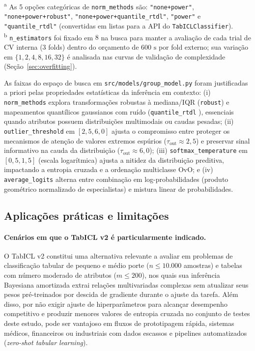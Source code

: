 \documentclass[11pt,a4paper]{article}
\begin{document}
\begin{table}[htbp]
    \begin{flushleft}
    \footnotesize
    \textsuperscript{a} As 5 opções categóricas de \texttt{norm\_methods} são: \texttt{"none+power"}, \texttt{"none+power+robust"}, \texttt{"none+power+quantile\_rtdl"}, \texttt{"power"} e \texttt{"quantile\_rtdl"} (convertidas em listas para a API do \texttt{TabICLClassifier}).\\
    \textsuperscript{b} \texttt{n\_estimators} foi fixado em $8$ na busca para manter a avaliação de cada trial de CV interna (3 folds) dentro do orçamento de $600\text{ s}$ por fold externo; sua variação em $\{1, 2, 4, 8, 16, 32\}$ é analisada nas curvas de validação de complexidade (Seção~\ref{sec:overfitting}).
    \end{flushleft}
\end{table}

As faixas do espaço de busca em \texttt{src/models/group\_model.py} foram justificadas a priori pelas propriedades estatísticas da inferência em contexto: (i) \texttt{norm\_methods} explora transformações robustas à mediana/IQR (\texttt{robust}) e mapeamentos quantílicos gaussianos com ruído (\texttt{quantile\_rtdl} \cite{gorishniy2021revisiting}), essenciais quando atributos possuem distribuições multimodais ou caudas pesadas; (ii) \texttt{outlier\_threshold} em $[2{,}5, 6{,}0]$ ajusta o compromisso entre proteger os mecanismos de atenção de valores extremos espúrios ($\tau_{\mathrm{out}} \approx 2{,}5$) e preservar sinal informativo na cauda da distribuição ($\tau_{\mathrm{out}} \approx 6{,}0$); (iii) \texttt{softmax\_temperature} em $[0{,}5, 1{,}5]$ (escala logarítmica) ajusta a nitidez da distribuição preditiva, impactando a entropia cruzada e a ordenação multiclasse OvO; e (iv) \texttt{average\_logits} alterna entre combinação em log-probabilidades (produto geométrico normalizado de especialistas) e mistura linear de probabilidades.

\subsection{Aplicações práticas e limitações}
\label{sec:limitacoes}

\paragraph{Cenários em que o TabICL v2 é particularmente indicado.}
O TabICL v2 constitui uma alternativa relevante a avaliar em problemas de classificação tabular de pequeno e médio porte ($n \le 10.000$ amostras) e tabelas com número moderado de atributos ($m \le 200$), nos quais sua inferência Bayesiana amortizada extrai relações multivariadas complexas sem atualizar seus pesos pré-treinados por descida de gradiente durante o ajuste da tarefa. Além disso, por não exigir ajuste de hiperparâmetros para alcançar desempenho competitivo e produzir menores valores de entropia cruzada no conjunto de testes deste estudo, pode ser vantajoso em fluxos de prototipagem rápida, sistemas médicos, financeiros ou industriais com dados escassos e pipelines automatizados (\emph{zero-shot tabular learning}).
\end{document}

